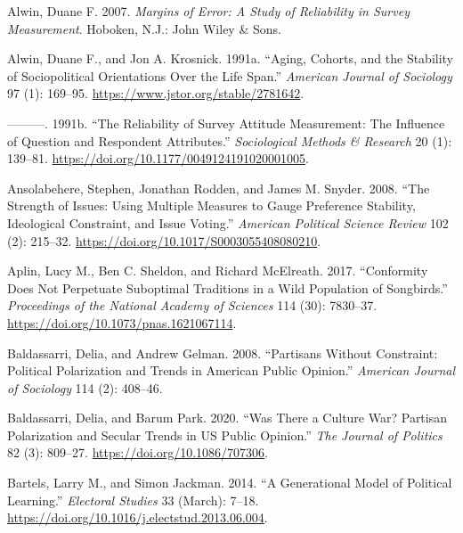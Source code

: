 \documentclass[
  12pt,
]{article}
\newlength{\cslhangindent}
\newlength{\cslentryspacingunit} %
\newenvironment{CSLReferences}[2] %
 {%
  \setlength{\parindent}{0pt}
  \ifodd #1
  \let\oldpar\par
  \def\par{\hangindent=\cslhangindent\oldpar}
  \fi
  \setlength{\parskip}{#2\cslentryspacingunit}
 }%
 {}
\begin{document}
\hypertarget{refs}{}
\begin{CSLReferences}{1}{0}
\leavevmode{}%
Alwin, Duane F. 2007. \emph{Margins of {Error}: {A} {Study} of {Reliability} in {Survey} {Measurement}}. Hoboken, N.J.: John Wiley \& Sons.

\leavevmode{}%
Alwin, Duane F., and Jon A. Krosnick. 1991a. {``Aging, {Cohorts}, and the {Stability} of {Sociopolitical} {Orientations} {Over} the {Life} {Span}.''} \emph{American Journal of Sociology} 97 (1): 169--95. \url{https://www.jstor.org/stable/2781642}.

\leavevmode{}%
---------. 1991b. {``The {Reliability} of {Survey} {Attitude} {Measurement}: {The} {Influence} of {Question} and {Respondent} {Attributes}.''} \emph{Sociological Methods \& Research} 20 (1): 139--81. \url{https://doi.org/10.1177/0049124191020001005}.

\leavevmode{}%
Ansolabehere, Stephen, Jonathan Rodden, and James M. Snyder. 2008. {``The {Strength} of {Issues}: {Using} {Multiple} {Measures} to {Gauge} {Preference} {Stability}, {Ideological} {Constraint}, and {Issue} {Voting}.''} \emph{American Political Science Review} 102 (2): 215--32. \url{https://doi.org/10.1017/S0003055408080210}.

\leavevmode{}%
Aplin, Lucy M., Ben C. Sheldon, and Richard McElreath. 2017. {``Conformity Does Not Perpetuate Suboptimal Traditions in a Wild Population of Songbirds.''} \emph{Proceedings of the National Academy of Sciences} 114 (30): 7830--37. \url{https://doi.org/10.1073/pnas.1621067114}.

\leavevmode{}%
Baldassarri, Delia, and Andrew Gelman. 2008. {``Partisans Without {Constraint}: {Political} {Polarization} and {Trends} in {American} {Public} {Opinion}.''} \emph{American Journal of Sociology} 114 (2): 408--46.

\leavevmode{}%
Baldassarri, Delia, and Barum Park. 2020. {``Was {There} a {Culture} {War}? {Partisan} {Polarization} and {Secular} {Trends} in {US} {Public} {Opinion}.''} \emph{The Journal of Politics} 82 (3): 809--27. \url{https://doi.org/10.1086/707306}.

\leavevmode{}%
Bartels, Larry M., and Simon Jackman. 2014. {``A Generational Model of Political Learning.''} \emph{Electoral Studies} 33 (March): 7--18. \url{https://doi.org/10.1016/j.electstud.2013.06.004}.


\end{CSLReferences}
\end{document}
